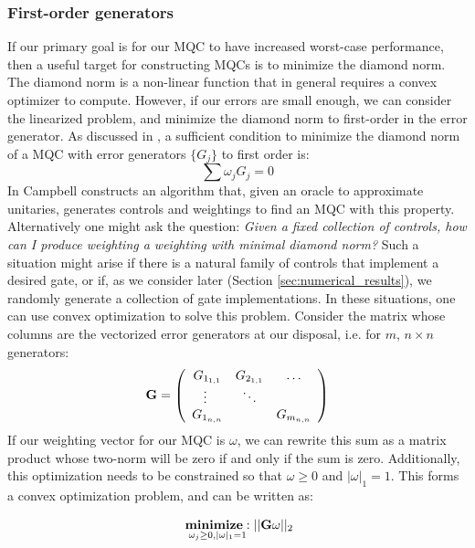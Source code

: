 \documentclass[aps,nofootinbib,pra,notitlepage,twocolumn]{revtex4-1}
\begin{document}
\subsubsection{First-order generators} %
\label{sub:first_order_generators}
If our primary goal is for our MQC to have increased worst-case performance, then a useful target for constructing MQCs is to minimize the diamond norm. The diamond norm is a non-linear function that in general requires a convex optimizer to compute. However, if our errors are small enough, we can consider the linearized problem, and minimize the diamond norm to first-order in the error generator. As discussed in \cite{Campbell2017}, a sufficient condition to minimize the diamond norm of a MQC with error generators $\{G_j\}$ to first order is:
\begin{equation}\label{eq:campbell-condition}
\sum \omega_j G_j = 0
\end{equation}
In \cite{Campbell2017} Campbell constructs an algorithm that, given an oracle to approximate unitaries, generates controls and weightings to find an MQC with this property. Alternatively one might ask the question: \textit{Given a fixed collection of controls, how can I produce weighting a weighting with minimal diamond norm?} Such a situation might arise if there is a natural family of controls that implement a desired gate, or if, as we consider later (Section \ref{sec:numerical_results}), we randomly generate a collection of gate implementations. In these situations, one can use convex optimization to solve this problem. Consider the matrix whose columns are the vectorized error generators at our disposal, i.e. for $m$, $n\times n$ generators:
\begin{equation}\label{eq:vectorized_generators}
	\bold{G} = \left(\begin{array}{cccc}
		G_{1_{1,1}} & G_{2_{1,1}} & \ldots   \\ 
		\vdots\ & \ddots &    \\
		G_{1_{n,n}} &  &  G_{m_{n,n}} \\ 
	\end{array} 	
	\right)
\end{equation}
If our weighting vector for our MQC is $\omega$, we can rewrite this sum as a matrix product whose two-norm will be zero if and only if the sum is zero. Additionally, this optimization needs to be constrained so that $\omega \geq 0$ and $|\omega|_1 = 1$. This forms a convex optimization problem, and can be written as:

\begin{equation}\label{eq:minimization}
  \begin{split}
    &\underset{\omega_j\geq0, |\omega|_1=1}{\textbf{minimize}: } ||\bold{G}\omega||_2\\
  \end{split}
\end{equation}
\end{document}
